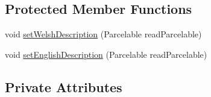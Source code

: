 \subsection*{Protected Member Functions}
\begin{DoxyCompactItemize}
\item 
void \hyperlink{classuk_1_1ac_1_1swan_1_1digitaltrails_1_1components_1_1_walk_a56413ef1e04ca02448ff6c807894a082}{set\+Welsh\+Description} (Parcelable read\+Parcelable)
\item 
void \hyperlink{classuk_1_1ac_1_1swan_1_1digitaltrails_1_1components_1_1_walk_a4a52f3ce8b9d5add613aac1fd101398d}{set\+English\+Description} (Parcelable read\+Parcelable)
\end{DoxyCompactItemize}
\subsection*{Private Attributes}
